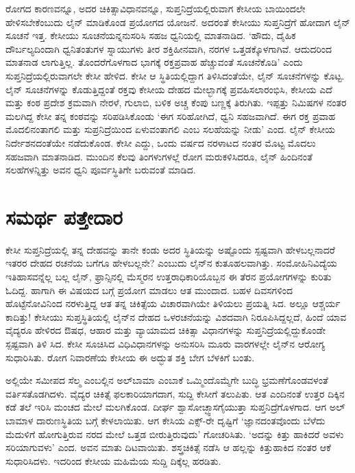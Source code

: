 ರೋಗದ ಕಾರಣವನ್ನೂ, ಅದರ ಚಿಕಿತ್ಸಾವಿಧಾನವನ್ನೂ, ಸುಪ್ತನಿದ್ರೆಯಲ್ಲಿರುವಾಗ ಕೇಸೀಯ ಬಾಯಿಂದಲೇ ಹೇಳಿಸಬೇಕೆಂಬುದು ಲೈನ್ ಮಾಡಿಕೊಂಡ ಪ್ರಯೋಗದ ಯೋಜನೆ. ಅದರಂತೆ ಕೇಸೀಯು ಸುಪ್ತನಿದ್ರೆಗೆ ಹೋದಾಗ ಲೈನ್ ಸೂಚನೆ ಇತ್ತ. ಕೇಸೀಯು ಸೂಚನೆಯನ್ನನುಸರಿಸಿ ಸಹಜ ಧ್ವನಿಯಲ್ಲಿ ಮಾತನಾಡಿದ. ‘ಹೌದು, ದೈಹಿಕ ದೌರ್ಬಲ್ಯದಿಂದಾಗಿ ಧ್ವನಿತಂತುಗಳ ಸ್ನಾಯುಗಳು ತೀರ ಶಕ್ತಿಹೀನವಾಗಿ, ನರಗಳ ಒತ್ತಡಕ್ಕೊಳಗಾಗಿವೆ. ಆದುದರಿಂದ ಮಾತನಾಡ ಲಾಗುತ್ತಿಲ್ಲ. ತೊಂದರೆಗೊಳಗಾದ ಭಾಗಕ್ಕೆ ರಕ್ತಪ್ರವಾಹ ಹೆಚ್ಚುವಂತೆ ಸೂಚನೆಕೊಡಿ’ ಎಂದು ಸುಪ್ತನಿದ್ರೆಯಲ್ಲಿರುವಾಗಲೇ ಕೇಸೀ ಹೇಳಿದ. ಕೇಸೀ ಆ ಸ್ಥಿತಿಯಲ್ಲಿದ್ದಾಗ ತಿಳಿಸಿದಂತೆಯೇ, ಲೈನ್ ಸೂಚನೆಗಳನ್ನು ಕೊಟ್ಟ. ಲೈನ್ ಸೂಚನೆಗಳನ್ನು ಕೊಡುತ್ತಿದ್ದಂತೆ ರಕ್ತವು ಕೇಸೀಯ ದೇಹದ ಮೇಲ್ಭಾಗಕ್ಕೆ ಪ್ರವಹಿಸಲಾರಂಭಿಸಿ, ಕೇಸೀಯ ಎದೆ ಮತ್ತು ಕಂಠ ಪ್ರದೇಶ ಕ್ರಮವಾಗಿ ನೇರಳೆ, ಗುಲಾಬಿ, ಬಳಿಕ ಅಚ್ಚ ಕೆಂಪು ಬಣ್ಣಕ್ಕೆ ತಿರುಗಿತು. ಇಪ್ಪತ್ತು ನಿಮಿಷಗಳ ನಂತರ ಮಲಗಿದ್ದ ಕೇಸೀ ತನ್ನ ಕಂಠವನ್ನು ಸರಿಪಡಿಸಿಕೊಂಡು ‘ಈಗ ಸರಿಹೋಗಿದೆ, ಧ್ವನಿ ಸಹಜವಾಗಿದೆ. ಈಗ ರಕ್ತ ಪ್ರವಾಹ ಮೊದಲಿನಂತಾಗಲಿ ಮತ್ತು ಸುಪ್ರನಿದ್ರೆಯಿಂದ ಏಳುವಂತಾಗಲಿ ಎಂಬ ಸಲಹೆಯನ್ನು ನೀಡು’ ಎಂದ. ಲೈನ್ ಕೇಸೀಯ ನಿರ್ದೇಶನದಂತೆಯೇ ನಡೆದುಕೊಂಡ. ಕೇಸೀ ಎದ್ದು, ಒಂದು ವರ್ಷದ ನರಳಾಟದ ನಂತರ ಮೊಟ್ಟ ಮೊದಲು ಸಹಜವಾಗಿ ಮಾತನಾಡಿದ. ಮುಂದಿನ ಕೆಲವು ತಿಂಗಳುಗಳಲ್ಲೆ ರೋಗ ಮರುಕಳಿಸಿದರೂ, ಲೈನ್ ಹಿಂದಿನಂತೆ ಸಲಹೆಗಳನ್ನಿತ್ತು ಅವನ ಧ್ವನಿ ಪೂರ್ವಸ್ಥಿತಿಗೇ ಬರುವಂತೆ ಮಾಡಿದ.


\section{ಸಮರ್ಥ ಪತ್ತೇದಾರ}

ಕೇಸೀ ಸುಪ್ತನಿದ್ರೆಯಲ್ಲಿ ತನ್ನ ದೇಹವನ್ನು ತಾನೇ ಕಂಡು ಅದರ ಸ್ಥಿತಿಯನ್ನು ಅಷ್ಟೊಂದು ಸ್ಪಷ್ಟವಾಗಿ ಹೇಳಬಲ್ಲನಾದರೆ ಇತರರ ದೇಹದ ರಚನೆಯ ಬಗೆಗೂ ಹೇಳಬಲ್ಲನೇ? ಎಂಬುದು ಲೈನ್​ನ ಕುತೂಹಲವಾಗಿತ್ತು. ಸಂಮೋಹಿನಿವಿದ್ಯೆಯ ಇತಿಹಾಸವನ್ನೆಲ್ಲ ಬಲ್ಲ ಲೈನ್, ಫ್ರಾನ್ಸಿನಲ್ಲಿ ಮೆಸ್ಮರನ ಉತ್ತರಾಧಿಕಾರಿಯೊಬ್ಬನ ಈ ತೆರನ ಪ್ರಯೋಗಗಳನ್ನು ಕುರಿತು ಓದಿದ್ದ. ಹಾಗಾಗಿ ಈ ವಿಷಯದ ಬಗ್ಗೆ ಪ್ರಯೋಗ ಮಾಡಲು ಆತ ಮುಂದಾದ. ಬಹಳ ದಿವಸಗಳಿಂದ ಹೊಟ್ಟೆನೋವಿನಿಂದ ನರಳುತ್ತಿದ್ದ ಆತ ತನ್ನ ಚಿಕಿತ್ಸೆಯ ವಿಚಾರವಾಗಿಯೇ ತಿಳಿಯಲು ಪ್ರಯತ್ನಿ ಸಿದ. ಅಲ್ಲೂ ಆಶ್ಚರ್ಯ ಕಾದಿತ್ತು! ಕೇಸೀಯು ಸುಪ್ತಸ್ಥಿತಿಯಲ್ಲಿ ಲೈನ್​ನ ದೇಹದ ಒಳರಚನೆಯನ್ನು ವಿಶದವಾಗಿ ನಿರೂಪಿಸಿದ್ದಲ್ಲದೆ, ಹಿಂದೆ ಯಾವ ವೈದ್ಯರೂ ಹೇಳಿರದ ಔಷಧ, ಆಹಾರ ಮತ್ತು ವ್ಯಾಯಾಮದ ಚಿಕಿತ್ಸಾ ವಿಧಾನಗಳನ್ನು ಸುಪ್ತನಿದ್ರೆಯಲ್ಲಿದ್ದುಕೊಂಡೇ ಸ್ಪಷ್ಟವಾಗಿ ತಿಳಿ ಸಿದ. ಕೇಸೀ ಸೂಚಿಸಿದ ವಿಧಿವಿಧಾನಗಳನ್ನು ಅನುಸರಿಸಿ ಮೂರು ವಾರಗಳಲ್ಲೇ ಲೈನ್​ನ ಆರೋಗ್ಯ ಸುಧಾರಿಸಿತು. ರೋಗ ನಿವಾರಣೆಯ ಕೇಸೀಯ ಈ ಅದ್ಭುತ ಶಕ್ತಿ ಬೇಗ ಬೆಳಕಿಗೆ ಬಂತು.

ಅಲ್ಲಿಯೇ ಸಮೀಪದ ಸೆಲ್ಮ ಎಂಬಲ್ಲಿನ ಅಲ್​ಬಾಮಾ ಎಂಬಾಕೆ ಒಮ್ಮಿಂದೊಮ್ಮೆಗೇ ಬುದ್ಧಿ ಭ್ರಮಣೆಗೊಂಡವಳಂತೆ ವರ್ತಿಸತೊಡಗಿದಳು. ವೈದ್ಯರ ಚಿಕಿತ್ಸೆ ಫಲಕಾರಿಯಾಗದಾಗ, ಸುದ್ದಿ ಕೇಸೀಗೆ ತಲುಪಿತು. ಆತ ಎಂದಿನಂತೆ ಉತ್ತರ ದಿಕ್ಕಿನ ಕಡೆ ತಲೆ ಇರಿಸಿ ಮಂಚದ ಮೇಲೆ ಮಲಗಿಕೊಂಡ. ದೀರ್ಘ ಶ್ವಾಸೋಚ್ಛ್ವಾಸಗೈಯುತ್ತಾ ಸುಪ್ತನಿದ್ರೆಗೊಳಗಾದ. ಆಗ ಅಲ್​ಬಾಮಾಳ ದಾರುಣಸ್ಥಿತಿಯ ಬಗ್ಗೆ ಕೇಳಲಾಯಿತು. ಆಗ ಕೇಸಿಯ ಎಕ್ಸ್​-ರೇ ದೃಷ್ಟಿಗೆ ‘ಜ್ಞಾನದಂತವೊಂದು ಬೆಳೆದು ಮೆದುಳಿಗೆ ಹೋಗುತ್ತಿರುವ ನರದ ಮೇಲೆ ಒತ್ತಡ ಬೀರುತ್ತಿರುವುದು’ ಗೋಚರಿಸಿತು. ‘ಅದನ್ನು ಕಿತ್ತು ಹಾಕಿದರೆ ಅವಳು ಸರಿಯಾಗುವಳು’ ಎಂದ. ಅವನ ಮಾತು ದಿಟವಾಯಿತು. ಶಸ್ತ್ರಚಿಕಿತ್ಸೆ ನಡೆಸಿ ಆ ಹಲ್ಲನ್ನು ಕಿತ್ತುಹಾಕಿದ ನಂತರ ಆಕೆ ಸುಧಾರಿಸಿದಳು. ಇದರಿಂದ ಕೇಸೀಯ ಮಹಿಮೆಯ ಸುದ್ದಿ ದಿಕ್ಕೆಲ್ಲ ಹರಡಿತು.


